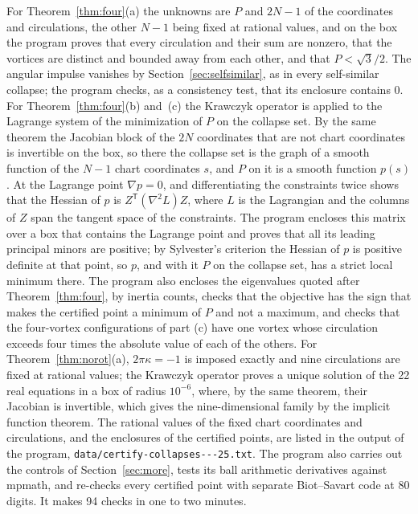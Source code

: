 \documentclass[11pt]{article}
\theoremstyle{definition}
\begin{document}
For Theorem~\ref{thm:four}(a) the unknowns are $P$ and $2N - 1$ of the coordinates and circulations, the other $N - 1$ being fixed at rational values, and on the box the program proves that every circulation and their sum are nonzero, that the vortices are distinct and bounded away from each other, and that $P < \sqrt{3}/2$. The angular impulse vanishes by Section~\ref{sec:selfsimilar}, as in every self-similar collapse; the program checks, as a consistency test, that its enclosure contains $0$. For Theorem~\ref{thm:four}(b) and~(c) the Krawczyk operator is applied to the Lagrange system of the minimization of $P$ on the collapse set. By the same theorem the Jacobian block of the $2N$ coordinates that are not chart coordinates is invertible on the box, so there the collapse set is the graph of a smooth function of the $N - 1$ chart coordinates $s$, and $P$ on it is a smooth function $p(s)$. At the Lagrange point $\nabla p = 0$, and differentiating the constraints twice shows that the Hessian of $p$ is $Z^{\mathsf T}(\nabla^2 L)Z$, where $L$ is the Lagrangian and the columns of $Z$ span the tangent space of the constraints. The program encloses this matrix over a box that contains the Lagrange point and proves that all its leading principal minors are positive; by Sylvester's criterion the Hessian of $p$ is positive definite at that point, so $p$, and with it $P$ on the collapse set, has a strict local minimum there. The program also encloses the eigenvalues quoted after Theorem~\ref{thm:four}, by inertia counts, checks that the objective has the sign that makes the certified point a minimum of $P$ and not a maximum, and checks that the four-vortex configurations of part (c) have one vortex whose circulation exceeds four times the absolute value of each of the others. For Theorem~\ref{thm:norot}(a), $2\pi\kappa = -1$ is imposed exactly and nine circulations are fixed at rational values; the Krawczyk operator proves a unique solution of the 22 real equations in a box of radius $10^{-6}$, where, by the same theorem, their Jacobian is invertible, which gives the nine-dimensional family by the implicit function theorem. The rational values of the fixed chart coordinates and circulations, and the enclosures of the certified points, are listed in the output of the program, \texttt{data/\allowbreak certify-\allowbreak collapses---\allowbreak 25.txt}. The program also carries out the controls of Section~\ref{sec:more}, tests its ball arithmetic derivatives against mpmath, and re-checks every certified point with separate Biot--Savart code at 80 digits. It makes 94 checks in one to two minutes.
\end{document}
